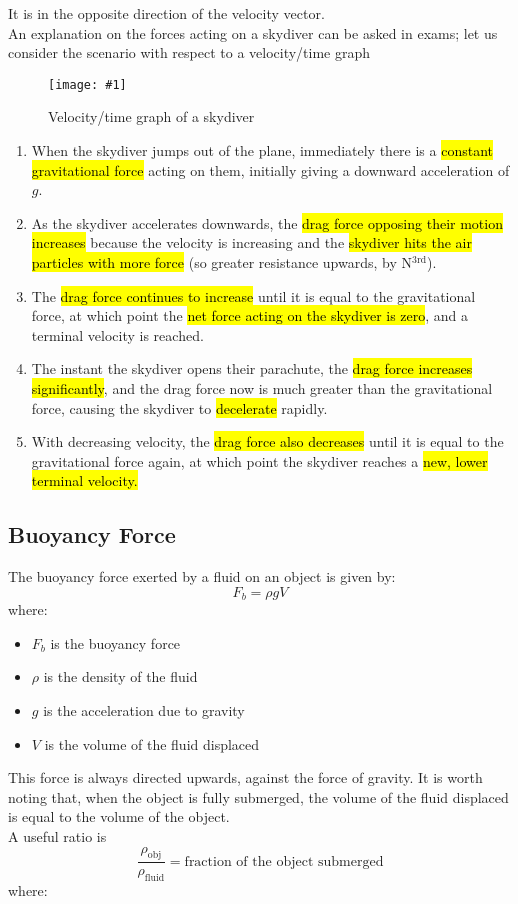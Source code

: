 \documentclass[a4paper,12pt]{article}
\newcommand{\lb}{\\[8pt]}
\newcommand{\img}[4]{\begin{center}
  \begin{figure}[H]
    \centering
    \texttt{[image: \#1]}
    \caption{#3}
    \label{fig:#4}
  \end{figure}
\end{center}}
\begin{document}
It is in the opposite direction of the velocity vector.\lb
An explanation on the forces acting on a skydiver can be asked in exams; let us consider the scenario with respect to a velocity/time graph
\img{material/terminalvgraph.png}{0.75}{Velocity/time graph of a skydiver}{skydiver}

\begin{enumerate}
  \item When the skydiver jumps out of the plane, immediately there is a \hl{constant gravitational force} acting on them, initially giving a downward acceleration of $g$.
  \item As the skydiver accelerates downwards, the \hl{drag force opposing their motion increases} because the velocity is increasing and the \hl{skydiver hits the air particles with more force} (so greater resistance upwards, by N$^{3\text{rd}}$).
  \item The \hl{drag force continues to increase} until it is equal to the gravitational force, at which point the \hl{net force acting on the skydiver is zero}, and a terminal velocity is reached.
  \item The instant the skydiver opens their parachute, the \hl{drag force increases significantly}, and the drag force now is much greater than the gravitational force, causing the skydiver to \hl{decelerate} rapidly.
  \item With decreasing velocity, the \hl{drag force also decreases} until it is equal to the gravitational force again, at which point the skydiver reaches a \hl{new, lower terminal velocity.}
\end{enumerate}

\pagebreak

\subsection{Buoyancy Force}

The buoyancy force exerted by a fluid on an object is given by:
$$F_b = \rho g V$$
where:
\begin{itemize}
  \item $F_b$ is the buoyancy force
  \item $\rho$ is the density of the fluid
  \item $g$ is the acceleration due to gravity
  \item $V$ is the volume of the fluid displaced
\end{itemize}

This force is always directed upwards, against the force of gravity. It is worth noting that, when the object is fully submerged, the volume of the fluid displaced is equal to the volume of the object.\lb
A useful ratio is
$$\frac{\rho_\text{obj}}{\rho_\text{fluid}} = \text{fraction of the object submerged}$$
where:
\end{document}
